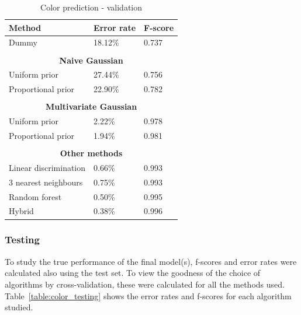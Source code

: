\documentclass[twoside]{article}
\begin{document}
\begin{multicols}{2}
\begin{table}[H]
\caption{Color prediction - validation}
\label{table:color_validation}
\begin{tabular}{lll}
\textbf{Method} & \textbf{Error rate} & \textbf{F-score}\\
\midrule
Dummy & 18.12\% & 0.737 \\
\\
\multicolumn{3}{c}{\textbf{Naive Gaussian}} \\
Uniform prior & 27.44\% & 0.756 \\
Proportional prior & 22.90\% & 0.782 \\
\\
\multicolumn{3}{c}{\textbf{Multivariate Gaussian}} \\
Uniform prior & 2.22\% & 0.978 \\
Proportional prior & 1.94\% & 0.981 \\
\\
\multicolumn{3}{c}{\textbf{Other methods}} \\
Linear discrimination & 0.66\% & 0.993 \\
$3$ nearest neighbours & 0.75\% & 0.993 \\
Random forest & 0.50\% & 0.995 \\
Hybrid & 0.38\% & 0.996 \\

\end{tabular}
\end{table}

\subsubsection{Testing}

To study the true performance of the final model(s), f-scores and error rates were calculated also using the test set. To view
the goodness of the choice of algorithms by cross-validation, these were calculated for all the methods used. 
Table~\ref{table:color_testing} shows the error rates and f-scores for each algorithm studied.


\end{multicols}
\end{document}
